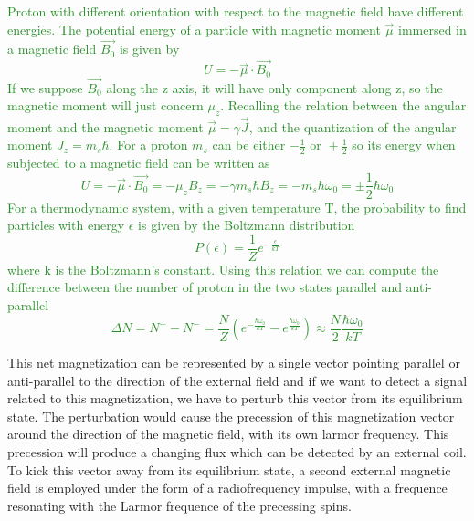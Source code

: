 \documentclass[11pt]{report}
\begin{document}
\textcolor{ForestGreen}{
Proton with different orientation with respect to the magnetic field have different energies.
The potential energy of a particle with magnetic moment $\vec{\mu}$ immersed in a magnetic field $\vec{B_0}$ is given by
\begin{equation}
U = -  \vec{\mu} \cdot \vec{B_0}
\end{equation}
If we suppose $\vec{B_0}$ along the z axis, it will have only component along z, so the magnetic moment will just concern $\mu_z$.
Recalling the relation between the angular moment and the magnetic moment $\vec{\mu} = \gamma \vec{J}$, and the quantization of the angular moment $J_z = m_s \hbar$.
For a proton $m_s$ can be either $-\frac{1}{2} \text{ or } +\frac{1}{2}$ so its energy when subjected to a magnetic field can be written as
\begin{equation}
U = -\vec{\mu} \cdot \vec{B_0} = - \mu_z B_z = - \gamma m_s \hbar B_z = - m_s \hbar \omega_0 = \pm \frac{1}{2} \hbar \omega_0
\end{equation}
For a thermodynamic system, with a given temperature T, the probability to find particles with energy $\epsilon$ is given by the Boltzmann distribution
\begin{equation}
P(\epsilon) = \frac{1}{Z} e^{-\frac{\epsilon}{kT}}
\end{equation}
where k is the Boltzmann's constant.
Using this relation we can compute the difference between the number of proton in the two states parallel and anti-parallel
\begin{equation}
\Delta N = N^+ - N^- = \frac{N}{Z}(e^{-\frac{\hbar \omega_0}{kT}} - e^{\frac{\hbar \omega_0}{kT}}) \approx \frac{N}{2}\frac{\hbar \omega_0}{kT}
\end{equation}
}


This net magnetization can be represented by a single vector pointing parallel or anti-parallel to the direction of the external field and if we want to detect a signal related to this magnetization, we have to perturb this vector from its equilibrium state.
The perturbation would cause the precession of this magnetization vector around the direction of the magnetic field, with its own larmor frequency.
This precession will produce a changing flux which can be detected by an external coil.
To kick this vector away from its equilibrium state, a second external magnetic field is employed under the form of a radiofrequency impulse, with a frequence resonating with the Larmor frequence of the precessing spins.
\end{document}
